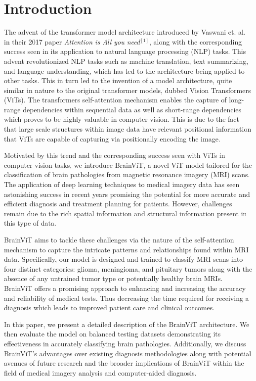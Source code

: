 \documentclass[conference]{IEEEtran}
\begin{document}
\section{Introduction}
The advent of the transformer model architecture introduced by Vaswani et. al. in their 2017 paper \textit{Attention is All you need}$^{[1]}$, along with the corresponding success seen in its application to natural language processing (NLP) tasks. This advent revolutionized NLP tasks such as machine translation, text summarizing, and language understanding, which has led to the architecture being applied to other tasks. This in turn led to the invention of a model architecture, quite similar in nature to the original transformer models, dubbed Vision Transformers (ViTs). The transformers self-attention mechanism enables the capture of long-range dependencies within sequential data as well as short-range dependencies which proves to be highly valuable in computer vision. This is due to the fact that large scale structures within image data have relevant positional information that ViTs are capable of capturing via positionally encoding the image.

Motivated by this trend and the corresponding success seen with ViTs in computer vision tasks, we introduce BrainViT, a novel ViT model tailored for the classification of brain pathologies from magnetic resonance imagery (MRI) scans. The application of deep learning techniques to medical imagery data has seen astonishing success in recent years promising the potential for more accurate and efficient diagnosis and treatment planning for patients. However, challenges remain due to the rich spatial information and structural information present in this type of data.

BrainViT aims to tackle these challenges via the nature of the self-attention mechanism to capture the intricate patterns and relationships found within MRI data. Specifically, our model is designed and trained to classify MRI scans into four distinct categories: glioma, meningioma, and pituitary tumors along with the absence of any untrained tumor type or potentially healthy brain MRIs. BrainViT offers a promising approach to enhancing and increasing the accuracy and reliability of medical tests. Thus decreasing the time required for receiving a diagnosis which leads to improved patient care and clinical outcomes. 

In this paper, we present a detailed description of the BrainViT architecture. We then evaluate the model on balanced testing datasets demonstrating its effectiveness in accurately classifying brain pathologies. Additionally, we discuss BrainViT's advantages over existing diagnosis methodologies along with potential avenues of future research and the broader implications of BrainViT within the field of medical imagery analysis and computer-aided diagnosis.
\end{document}
